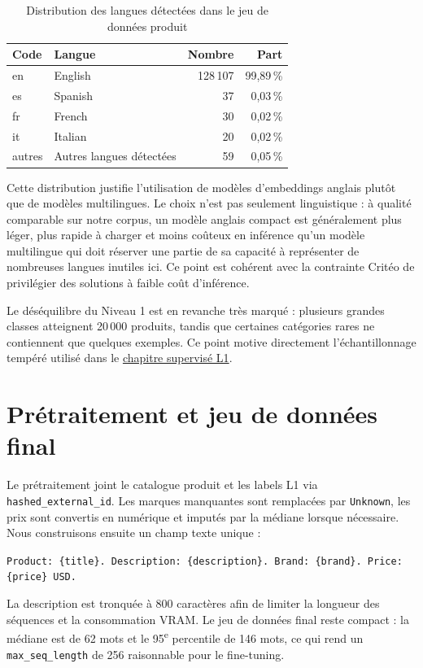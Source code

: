 \documentclass[12pt,a4paper]{report}
\begin{document}
\begin{table}[H]
    \centering
    \caption{Distribution des langues détectées dans le jeu de données produit}
    \label{tab:lang-dist-main}
    \begin{tabular}{llrr}
        \toprule
        \textbf{Code} & \textbf{Langue} & \textbf{Nombre} & \textbf{Part} \\
        \midrule
        en & English & 128\,107 & 99{,}89\,\% \\
        es & Spanish & 37 & 0{,}03\,\% \\
        fr & French & 30 & 0{,}02\,\% \\
        it & Italian & 20 & 0{,}02\,\% \\
        autres & Autres langues détectées & 59 & 0{,}05\,\% \\
        \bottomrule
    \end{tabular}
\end{table}

Cette distribution justifie l'utilisation de modèles d'embeddings anglais plutôt que de modèles multilingues. Le choix n'est pas seulement linguistique : à qualité comparable sur notre corpus, un modèle anglais compact est généralement plus léger, plus rapide à charger et moins coûteux en inférence qu'un modèle multilingue qui doit réserver une partie de sa capacité à représenter de nombreuses langues inutiles ici. Ce point est cohérent avec la contrainte Critéo de privilégier des solutions à faible coût d'inférence.

Le déséquilibre du Niveau 1 est en revanche très marqué : plusieurs grandes classes atteignent 20\,000 produits, tandis que certaines catégories rares ne contiennent que quelques exemples. Ce point motive directement l'échantillonnage tempéré utilisé dans le \hyperref[chap:l1-supervised]{chapitre supervisé L1}.

\section{Prétraitement et jeu de données final}

Le prétraitement joint le catalogue produit et les labels L1 via \texttt{hashed\_external\_id}. Les marques manquantes sont remplacées par \texttt{Unknown}, les prix sont convertis en numérique et imputés par la médiane lorsque nécessaire. Nous construisons ensuite un champ texte unique :
\begin{center}
\texttt{Product: \{title\}. Description: \{description\}. Brand: \{brand\}. Price: \{price\} USD.}
\end{center}
La description est tronquée à 800 caractères afin de limiter la longueur des séquences et la consommation VRAM. Le jeu de données final reste compact : la médiane est de 62 mots et le 95\textsuperscript{e} percentile de 146 mots, ce qui rend un \texttt{max\_seq\_length} de 256 raisonnable pour le fine-tuning.
\end{document}
